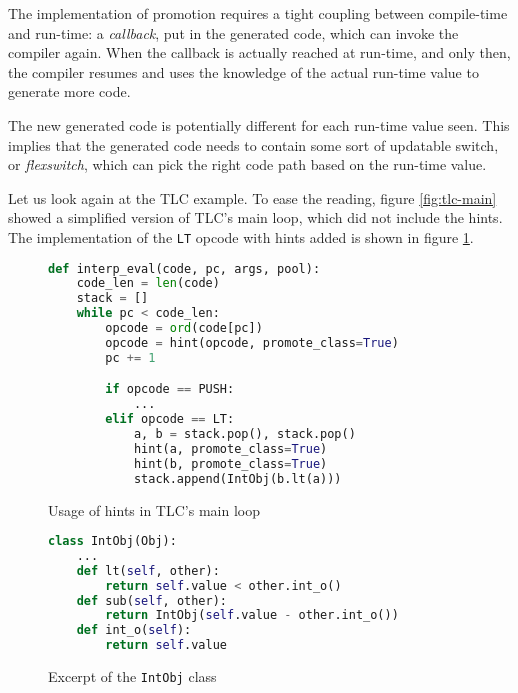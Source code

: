 The implementation of promotion requires a tight coupling between
compile-time and run-time: a \emph{callback}, put in the generated code,
which can invoke the compiler again.  When the callback is actually
reached at run-time, and only then, the compiler resumes and uses the
knowledge of the actual run-time value to generate more code.

The new generated code is potentially different for each run-time value
seen.  This implies that the generated code needs to contain some sort
of updatable switch, or \emph{flexswitch}, which can pick the right code path based on the
run-time value.

Let us look again at the TLC example.  To ease the reading, figure
\ref{fig:tlc-main} showed a simplified version of TLC's main loop, which did
not include the hints.  The implementation of the \lstinline{LT} opcode with
hints added is shown in figure \ref{fig:tlc-main-hints}.

\begin{figure}[h]
\begin{center}
\begin{lstlisting}[language=Python]
def interp_eval(code, pc, args, pool):
    code_len = len(code)
    stack = []
    while pc < code_len:
        opcode = ord(code[pc])
        opcode = hint(opcode, promote_class=True)
        pc += 1

        if opcode == PUSH:
            ...
        elif opcode == LT:
            a, b = stack.pop(), stack.pop()
            hint(a, promote_class=True)
            hint(b, promote_class=True)
            stack.append(IntObj(b.lt(a)))
\end{lstlisting}
\caption{Usage of hints in TLC's main loop}
\label{fig:tlc-main-hints}
\end{center}
\end{figure}

\begin{figure}[h]
\begin{center}
\begin{lstlisting}[language=Python]
class IntObj(Obj):
    ...
    def lt(self, other): 
        return self.value < other.int_o()
    def sub(self, other):
        return IntObj(self.value - other.int_o())
    def int_o(self):
        return self.value
\end{lstlisting}
\caption{Excerpt of the \lstinline{IntObj} class}
\label{fig:tlc-intobj}
\end{center}
\end{figure}

